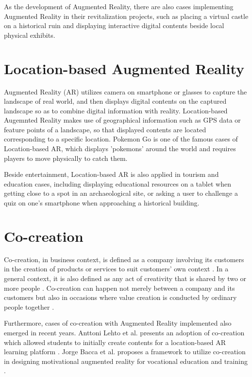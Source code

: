 As the development of Augmented Reality, there are also cases implementing Augmented Reality in their revitalization projects,
such as placing a virtual castle on a historical ruin and displaying interactive digital contents beside local physical exhibits.

\section{Location-based Augmented Reality}
Augmented Reality (AR) utilizes camera on smartphone or glasses to capture the landscape of real world,
and then displays digital contents on the captured landscape so as to combine digital information with reality.
Location-based Augemnted Reality makes use of geographical information such as GPS data or feature points of a landscape,
so that displayed contents are located corresponding to a specific location.
Pokemon Go is one of the famous cases of Location-based AR, which displays 'pokemons' around the world and requires players to move physically to catch them.

Beside entertainment, Location-based AR is also applied in tourism and education cases,
including displaying educational resources on a tablet when getting close to a spot in an archaeological site,
or asking a user to challenge a quiz on one's smartphone when approaching a historical building.

\section{Co-creation}
Co-creation, in business context, is defined as a company involving its customers in the creation of products or services to suit customers' own context \cite{cocreation_definition}.
In a general context, it is also defined as any act of creativity that is shared by two or more people \cite{cocreation_definition_general}.
Co-creation can happen not merely between a company and its customers but also in occasions where value creation is conducted by ordinary people together \cite{cocreation_general_case}.

Furthermore, cases of co-creation with Augmented Reality implemented also emerged in recent years.
Anttoni Lehto et al. presents an adoption of co-creation which allowed students to initially create contents for a location-based AR learning platform \cite{lehto_lautkankare_brander_ala-nissila_saari_salminen_2020}.
Jorge Bacca et al. proposes a framework to utilize co-creation in designing motivational augmented reality for vocational education and training \cite{acosta_navarro_gesa_kinshuk_2019}.
